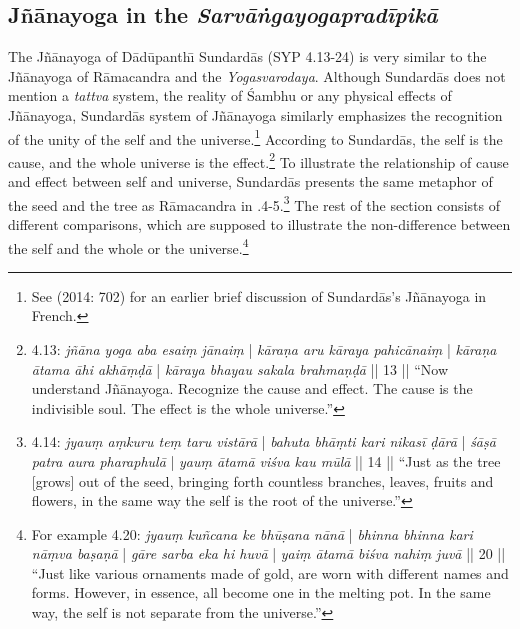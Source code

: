 \subsection{Jñānayoga in the \textit{Sarvāṅgayogapradīpikā}}

The Jñānayoga of Dādūpanthı̄ Sundardās (SYP 4.13-24) is very similar to the Jñānayoga of Rāmacandra and the \textit{Yogasvarodaya}. Although Sundardās does not mention a \textit{tattva} system, the reality of Śambhu or any physical effects of Jñānayoga, Sundardās system of Jñānayoga similarly emphasizes the recognition of the unity of the self and the universe.\footnote{See \citeauthor{burger2014sarvangayogapradipika} (2014: 702) for an earlier brief discussion of Sundardās's Jñānayoga in French.} According to Sundardās, the self is the cause, and the whole universe is the effect.\footnote{ 4.13: \textit{jñāna yoga aba esaiṃ jānaiṃ} | \textit{kāraṇa aru kāraya pahicānaiṃ} | \textit{kāraṇa ātama āhi akhāṃḍā} | \textit{kāraya bhayau sakala brahmaṇḍā} || 13 || ``Now understand Jñānayoga. Recognize the cause and effect. The cause is the indivisible soul. The effect is the whole universe.''} To illustrate the relationship of cause and effect between self and universe, Sundardās presents the same metaphor of the seed and the tree as Rāmacandra in .4-5.\footnote{ 4.14: \textit{jyauṃ aṃkuru teṃ taru vistārā} | \textit{bahuta bhāṃti kari nikasī ḍārā} | \textit{śāṣā patra aura pharaphulā} | \textit{yauṃ ātamā viśva kau mūlā} || 14 || ``Just as the tree [grows] out of the seed, bringing forth countless branches, leaves, fruits and flowers, in the same way the self is the root of the universe.''} The rest of the section consists of different comparisons, which are supposed to illustrate the non-difference between the self and the whole or the universe.\footnote{For example  4.20: \textit{jyauṃ kuñcana ke bhūṣana nānā} | \textit{bhinna bhinna kari nāṃva baṣaṇā} | \textit{gāre sarba eka hi huvā} | \textit{yaiṃ ātamā biśva nahiṃ juvā} || 20 || ``Just like various ornaments made of gold, are worn with different names and forms. However, in essence, all become one in the melting pot. In the same way, the self is not separate from the universe.''}


